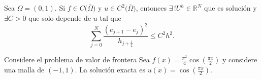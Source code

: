 \begin{frame}
	\begin{theorem}[]
		Sea $\Omega=\left(0,1\right)$.
		Si $f\in C\big(\overline{\Omega}\big)$ y
		$u\in C^{2}\big(\overline{\Omega}\big)$, entonces
		$\exists\,!U^{h}\in\mathbb{R}^{N}$ que es solución
		y $\exists C>0$ que solo depende de $u$ tal que
		\begin{equation*}
			\sum_{j=0}^{N}
			\frac{\left(e_{j+1}-e_{j}\right)^{2}}{h_{j+\frac{1}{2}}}\leq
			C^{2}h^{2}.
		\end{equation*}
	\end{theorem}

	\begin{example}
		Considere el problema de valor de frontera Sea
		\begin{math}
			f\left(x\right)=
			\frac{\pi^{2}}{4}
			\cos\left(\frac{\pi x}{2}\right)
		\end{math}
		y considere una malla de $\left(-1,1\right)$.
		La solución exacta es
		\begin{math}
			u\left(x\right)=
			\cos\left(\frac{\pi x}{2}\right)
		\end{math}.
	\end{example}
\end{frame}
